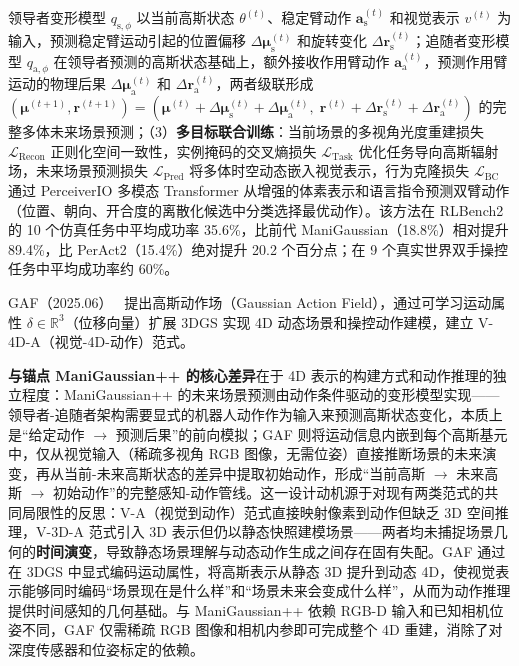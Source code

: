 领导者变形模型 $q_{\text{s},\phi}$ 以当前高斯状态 $\theta^{(t)}$、稳定臂动作 $\mathbf{a}_{\text{s}}^{(t)}$ 和视觉表示 $v^{(t)}$ 为输入，预测稳定臂运动引起的位置偏移 $\Delta\boldsymbol{\mu}_{\text{s}}^{(t)}$ 和旋转变化 $\Delta\mathbf{r}_{\text{s}}^{(t)}$；追随者变形模型 $q_{\text{a},\phi}$ 在领导者预测的高斯状态基础上，额外接收作用臂动作 $\mathbf{a}_{\text{a}}^{(t)}$，预测作用臂运动的物理后果 $\Delta\boldsymbol{\mu}_{\text{a}}^{(t)}$ 和 $\Delta\mathbf{r}_{\text{a}}^{(t)}$，两者级联形成 $(\boldsymbol{\mu}^{(t+1)}, \mathbf{r}^{(t+1)}) = (\boldsymbol{\mu}^{(t)} + \Delta\boldsymbol{\mu}_{\text{s}}^{(t)} + \Delta\boldsymbol{\mu}_{\text{a}}^{(t)},\; \mathbf{r}^{(t)} + \Delta\mathbf{r}_{\text{s}}^{(t)} + \Delta\mathbf{r}_{\text{a}}^{(t)})$ 的完整多体未来场景预测；（3）\textbf{多目标联合训练}：当前场景的多视角光度重建损失 $\mathcal{L}_\text{Recon}$ 正则化空间一致性，实例掩码的交叉熵损失 $\mathcal{L}_\text{Task}$ 优化任务导向高斯辐射场，未来场景预测损失 $\mathcal{L}_\text{Pred}$ 将多体时空动态嵌入视觉表示，行为克隆损失 $\mathcal{L}_\text{BC}$ 通过 PerceiverIO 多模态 Transformer 从增强的体素表示和语言指令预测双臂动作（位置、朝向、开合度的离散化候选中分类选择最优动作）。该方法在 RLBench2 的 10 个仿真任务中平均成功率 35.6\%，比前代 ManiGaussian（18.8\%）相对提升 89.4\%，比 PerAct2（15.4\%）绝对提升 20.2 个百分点；在 9 个真实世界双手操控任务中平均成功率约 60\%。

GAF（2025.06）~\cite{2506_14135} 提出高斯动作场（Gaussian Action Field），通过可学习运动属性 $\delta \in \mathbb{R}^3$（位移向量）扩展 3DGS 实现 4D 动态场景和操控动作建模，建立 V-4D-A（视觉-4D-动作）范式。

\textbf{与锚点 ManiGaussian++ 的核心差异}在于 4D 表示的构建方式和动作推理的独立程度：ManiGaussian++ 的未来场景预测由动作条件驱动的变形模型实现——领导者-追随者架构需要显式的机器人动作作为输入来预测高斯状态变化，本质上是``给定动作 $\to$ 预测后果''的前向模拟；GAF 则将运动信息内嵌到每个高斯基元中，仅从视觉输入（稀疏多视角 RGB 图像，无需位姿）直接推断场景的未来演变，再从当前-未来高斯状态的差异中提取初始动作，形成``当前高斯 $\to$ 未来高斯 $\to$ 初始动作''的完整感知-动作管线。这一设计动机源于对现有两类范式的共同局限性的反思：V-A（视觉到动作）范式直接映射像素到动作但缺乏 3D 空间推理，V-3D-A 范式引入 3D 表示但仍以静态快照建模场景——两者均未捕捉场景几何的\textbf{时间演变}，导致静态场景理解与动态动作生成之间存在固有失配。GAF 通过在 3DGS 中显式编码运动属性，将高斯表示从静态 3D 提升到动态 4D，使视觉表示能够同时编码``场景现在是什么样''和``场景未来会变成什么样''，从而为动作推理提供时间感知的几何基础。与 ManiGaussian++ 依赖 RGB-D 输入和已知相机位姿不同，GAF 仅需稀疏 RGB 图像和相机内参即可完成整个 4D 重建，消除了对深度传感器和位姿标定的依赖。

